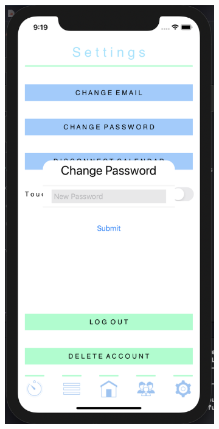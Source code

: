 \begin{figure}[H]
    \centering
    \begin{subfigure}[b]{0.3\textwidth}
        \centering
        \includegraphics[width=\textwidth]{./graphics/Implementation/Settings/change password.png}

\end{subfigure}
\end{figure}
